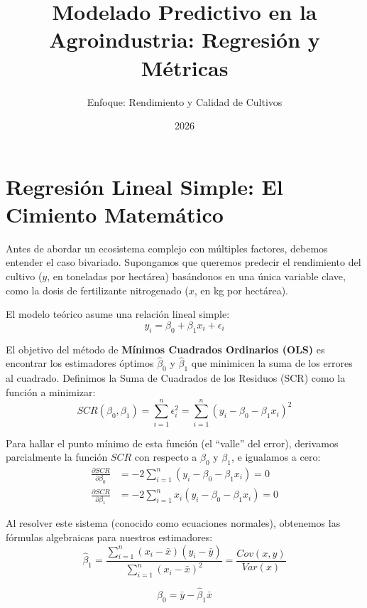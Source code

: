 \documentclass{article}
\title{Modelado Predictivo en la Agroindustria: Regresión y Métricas}
\author{Enfoque: Rendimiento y Calidad de Cultivos}
\date{2026}
\begin{document}
\maketitle

\section{Regresión Lineal Simple: El Cimiento Matemático}

Antes de abordar un ecosistema complejo con múltiples factores, debemos entender el caso bivariado. Supongamos que queremos predecir el rendimiento del cultivo ($y$, en toneladas por hectárea) basándonos en una única variable clave, como la dosis de fertilizante nitrogenado ($x$, en kg por hectárea).

El modelo teórico asume una relación lineal simple:
\begin{equation}
y_i = \beta_0 + \beta_1 x_i + \epsilon_i
\end{equation}

El objetivo del método de \textbf{Mínimos Cuadrados Ordinarios (OLS)} es encontrar los estimadores óptimos $\hat{\beta}_0$ y $\hat{\beta}_1$ que minimicen la suma de los errores al cuadrado. Definimos la Suma de Cuadrados de los Residuos (SCR) como la función a minimizar:
\begin{equation}
SCR(\beta_0, \beta_1) = \sum_{i=1}^{n} \epsilon_i^2 = \sum_{i=1}^{n} (y_i - \beta_0 - \beta_1 x_i)^2
\end{equation}

Para hallar el punto mínimo de esta función (el ``valle'' del error), derivamos parcialmente la función $SCR$ con respecto a $\beta_0$ y $\beta_1$, e igualamos a cero:
\begin{align}
\frac{\partial SCR}{\partial \beta_0} &= -2 \sum_{i=1}^{n} (y_i - \beta_0 - \beta_1 x_i) = 0 \\
\frac{\partial SCR}{\partial \beta_1} &= -2 \sum_{i=1}^{n} x_i(y_i - \beta_0 - \beta_1 x_i) = 0
\end{align}

Al resolver este sistema (conocido como ecuaciones normales), obtenemos las fórmulas algebraicas para nuestros estimadores:
\begin{equation}
\hat{\beta}_1 = \frac{\sum_{i=1}^{n} (x_i - \bar{x})(y_i - \bar{y})}{\sum_{i=1}^{n} (x_i - \bar{x})^2} = \frac{Cov(x,y)}{Var(x)}
\end{equation}

\begin{equation}
\hat{\beta}_0 = \bar{y} - \hat{\beta}_1 \bar{x}
\end{equation}
\end{document}
